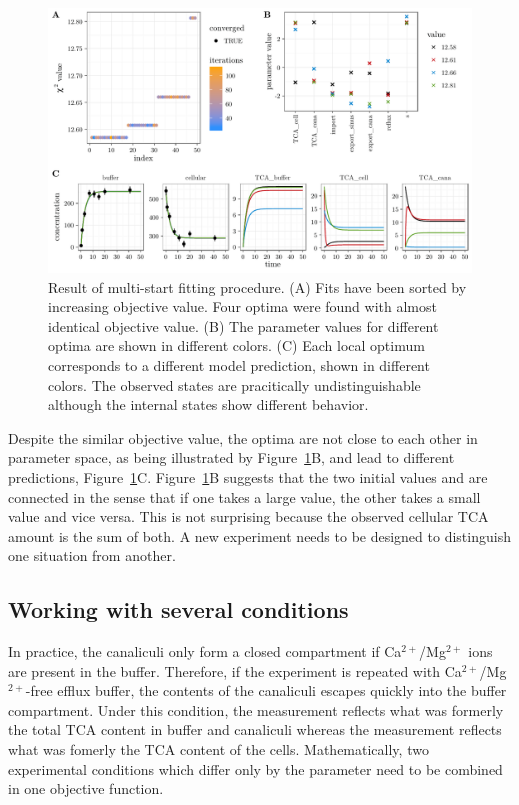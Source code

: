 \documentclass[article]{jss}
\begin{document}
\begin{figure}[ht]
	\centering
	\includegraphics[width = \textwidth]{images/figure5}
	\caption{Result of multi-start fitting procedure. (A) Fits have been sorted by increasing objective value. Four optima were found with almost identical objective value. (B) The parameter values for different optima are shown in different colors. (C) Each local optimum corresponds to a different model prediction, shown in different colors. The observed states are pracitically undistinguishable although the internal states show different behavior.}
	\label{fig:mstrust}
\end{figure}
Despite the similar objective value, the optima are not close to each other in parameter space, as being illustrated by Figure~\ref{fig:mstrust}B, and lead to different predictions, Figure~\ref{fig:mstrust}C. 
Figure~\ref{fig:mstrust}B suggests that the two initial values  and  are connected in the sense that if one takes a large value, the other takes a small value and vice versa.
This is not surprising because the observed cellular TCA amount is the sum of both. A new experiment needs to be designed to distinguish one situation from another.


\subsection{Working with several conditions}\label{sec:conditions}
In practice, the canaliculi only form a closed compartment if Ca$^{2+}$/Mg$^{2+}$ ions are present in the buffer. Therefore, if the experiment is repeated with Ca$^{2+}$/Mg$^{2+}$-free efflux buffer, the contents of the canaliculi escapes quickly into the buffer compartment. Under this condition, the  measurement reflects what was formerly the total TCA content in buffer and canaliculi whereas the  measurement reflects what was fomerly the TCA content of the cells.
Mathematically, two experimental conditions which differ only by the  parameter need to be combined in one objective function.
\end{document}

